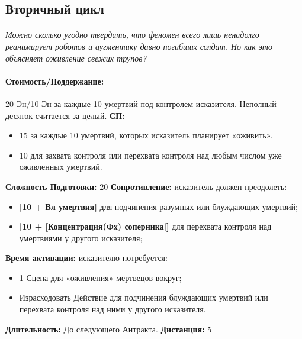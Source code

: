 
\subsection{Вторичный цикл}
\paragraph{} 
\textit{Можно сколько угодно твердить, что феномен всего лишь ненадолго реанимирует роботов и аугментику давно погибших солдат. Но как это объясняет оживление свежих трупов?}
\paragraph{Стоимость/Поддержание: }20 Эн/10 Эн за каждые 10 умертвий под контролем исказителя. Неполный десяток считается за целый.
\leavevmode
\newline 
\textbf{СП: }
\begin{itemize} 
\item 15 за каждые 10 умертвий, которых исказитель планирует «оживить». 
\item 10 для захвата контроля или перехвата контроля над любым числом уже оживленных умертвий. 
\end{itemize}
\leavevmode
\newline 
\textbf{Сложность Подготовки: }20
\leavevmode
\newline 
\textbf{Сопротивление: }исказитель должен преодолеть: 
\begin{itemize} 
\item 
\textbf{|10 + Вл умертвия|} для подчинения разумных или блуждающих умертвий; 
\item 
\textbf{|10 + [Концентрация(Фх) соперника|]} для перехвата контроля над умертвиями у другого исказителя; 
\end{itemize}
\leavevmode
\newline 
\textbf{Время активации: }исказителю потребуется: 
\begin{itemize} 
\item 1 Сцена для «оживления» мертвецов вокруг; 
\item Израсходовать Действие для подчинения блуждающих умертвий или перехвата контроля над ними у другого исказителя. 
\end{itemize}
\leavevmode
\newline 
\textbf{Длительность: }До следующего Антракта.
\leavevmode
\newline 
\textbf{Дистанция: }5

